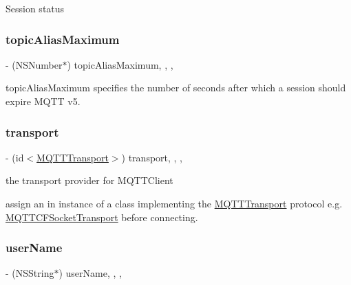 Session status \mbox{\label{interface_m_q_t_t_session_a4cd7f476fc8c6e86927afa8fad70b820}} 
\subsubsection{\texorpdfstring{topic\+Alias\+Maximum}{topicAliasMaximum}}
{\footnotesize\ttfamily -\/ (N\+S\+Number$\ast$) topic\+Alias\+Maximum\hspace{0.3cm}{\ttfamily [read]}, {\ttfamily [write]}, {\ttfamily [nonatomic]}, {\ttfamily [strong]}}

topic\+Alias\+Maximum specifies the number of seconds after which a session should expire M\+Q\+TT v5. \mbox{\label{interface_m_q_t_t_session_ab3839efa8f1e67c2a1270a0bfa7362c1}} 
\subsubsection{\texorpdfstring{transport}{transport}}
{\footnotesize\ttfamily -\/ (id$<$\hyperlink{interface_m_q_t_t_transport}{M\+Q\+T\+T\+Transport}$>$) transport\hspace{0.3cm}{\ttfamily [read]}, {\ttfamily [write]}, {\ttfamily [nonatomic]}, {\ttfamily [strong]}}

the transport provider for M\+Q\+T\+T\+Client

assign an in instance of a class implementing the \hyperlink{interface_m_q_t_t_transport}{M\+Q\+T\+T\+Transport} protocol e.\+g. \hyperlink{interface_m_q_t_t_c_f_socket_transport}{M\+Q\+T\+T\+C\+F\+Socket\+Transport} before connecting. \mbox{\label{interface_m_q_t_t_session_a23cc4596889bf5798bf3749ee0a9e61f}} 
\subsubsection{\texorpdfstring{user\+Name}{userName}}
{\footnotesize\ttfamily -\/ (N\+S\+String$\ast$) user\+Name\hspace{0.3cm}{\ttfamily [read]}, {\ttfamily [write]}, {\ttfamily [nonatomic]}, {\ttfamily [strong]}}


